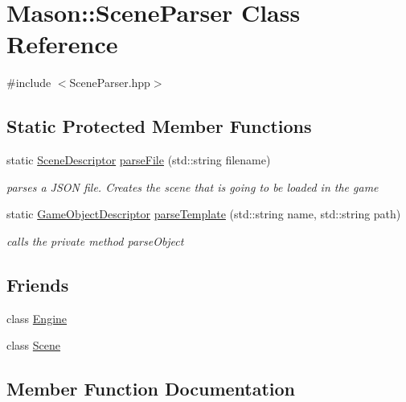 \hypertarget{class_mason_1_1_scene_parser}{}\section{Mason\+:\+:Scene\+Parser Class Reference}
\label{class_mason_1_1_scene_parser}


{\ttfamily \#include $<$Scene\+Parser.\+hpp$>$}

\subsection*{Static Protected Member Functions}
\begin{DoxyCompactItemize}
\item 
static \hyperlink{class_mason_1_1_scene_descriptor}{Scene\+Descriptor} \hyperlink{class_mason_1_1_scene_parser_ade3727eacb10881f5db54e649d649354}{parse\+File} (std\+::string filename)
\begin{DoxyCompactList}\small\item\em parses a J\+S\+ON file. Creates the scene that is going to be loaded in the game \end{DoxyCompactList}\item 
static \hyperlink{class_mason_1_1_game_object_descriptor}{Game\+Object\+Descriptor} \hyperlink{class_mason_1_1_scene_parser_a3e637ac719b878f7c11741b7c0d6c443}{parse\+Template} (std\+::string name, std\+::string path)
\begin{DoxyCompactList}\small\item\em calls the private method parse\+Object \end{DoxyCompactList}\end{DoxyCompactItemize}
\subsection*{Friends}
\begin{DoxyCompactItemize}
\item 
class \hyperlink{class_mason_1_1_scene_parser_a3e1914489e4bed4f9f23cdeab34a43dc}{Engine}
\item 
class \hyperlink{class_mason_1_1_scene_parser_a032858ae1fe02d2d1170981c2af2d67c}{Scene}
\end{DoxyCompactItemize}


\subsection{Member Function Documentation}
\hypertarget{class_mason_1_1_scene_parser_ade3727eacb10881f5db54e649d649354}{}\label{class_mason_1_1_scene_parser_ade3727eacb10881f5db54e649d649354} 
